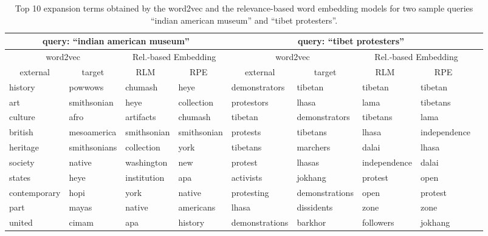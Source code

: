 \documentclass[sigconf]{acmart}
\begin{document}
\begin{table*}[t]
\centering
\caption{Top 10 expansion terms obtained by the word2vec and the relevance-based word embedding models for two sample queries  ``indian american museum'' and ``tibet protesters''.}
\begin{tabular}{|p{1.85cm}|p{1.85cm}|p{1.85cm}|p{1.85cm}||p{1.85cm}|p{1.85cm}|p{1.85cm}|p{1.85cm}|p{1.85cm}|} \hline
 \multicolumn{4}{|c||}{query: ``indian american museum''} & \multicolumn{4}{c|}{query: ``tibet protesters''}  \\\hline
\multicolumn{2}{|c|}{word2vec} & \multicolumn{2}{c||}{Rel.-based Embedding} & \multicolumn{2}{c|}{word2vec} & \multicolumn{2}{c|}{Rel.-based Embedding} \\\hline
\multicolumn{1}{|c|}{external} & \multicolumn{1}{c|}{target} & \multicolumn{1}{c|}{RLM~} & \multicolumn{1}{c||}{RPE~} & \multicolumn{1}{c|}{external} & \multicolumn{1}{c|}{target} & \multicolumn{1}{c|}{RLM~} & \multicolumn{1}{c|}{RPE~} \\\hline
 history & powwows & chumash & heye & demonstrators & tibetan & tibetan & tibetan \\
 art & smithsonian & heye & collection & protestors & lhasa & lama & tibetans \\
 culture & afro & artifacts & chumash & tibetan & demonstrators & tibetans & lama \\
 british & mesoamerica & smithsonian & smithsonian & protests & tibetans & lhasa & independence \\
 heritage & smithsonians & collection & york & tibetans & marchers & dalai & lhasa \\
 society & native & washington & new & protest & lhasas & independence & dalai \\
 states & heye & institution & apa & activists & jokhang & protest & open \\
 contemporary & hopi & york & native & protesting & demonstrations & open & protest \\
 part & mayas & native & americans & lhasa & dissidents & zone & zone \\
 united & cimam & apa & history & demonstrations & barkhor & followers & jokhang \\\hline
 
 
 

\end{tabular}
\label{tab:example}
\vspace{-0.2cm}
\end{table*}
\end{document}
